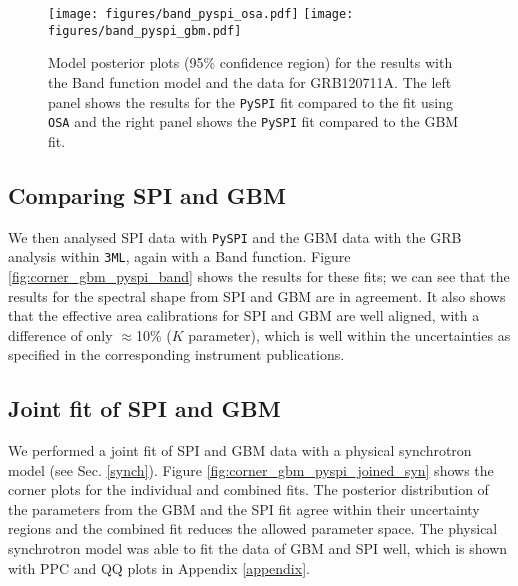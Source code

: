 \documentclass{aa}
\begin{document}
\begin{figure*}
  \begin{centering}
    \texttt{[image: figures/band\_pyspi\_osa.pdf]}
    \texttt{[image: figures/band\_pyspi\_gbm.pdf]}
    \caption{Model posterior plots (95\% confidence region) for the results with the Band function model and the data for GRB120711A. The left panel shows the results for the {\tt PySPI} fit compared to the fit using {\tt OSA} and the right panel shows the {\tt PySPI} fit compared to the GBM fit.}
    \label{fig:model_plot_band}
  \end{centering}
\end{figure*}

\subsection{Comparing SPI and GBM}
\label{pyspi_gbm}
We then analysed SPI data with {\tt PySPI} and the GBM data with the GRB analysis within {\tt 3ML}, again with a Band function. Figure \ref{fig:corner_gbm_pyspi_band} shows the results for these fits; we can see that the results for the spectral shape from SPI and GBM are in agreement. It also shows that the effective area calibrations for SPI and GBM are well aligned, with a difference of  only $\approx$10\%
 ($K$ parameter), which is well within the
uncertainties as specified in the corresponding instrument publications.

\subsection{Joint fit of SPI and GBM}
\label{pyspi_gbm_joined}
We performed a joint fit of SPI and GBM data with a physical synchrotron model (see Sec. \ref{synch}). Figure \ref{fig:corner_gbm_pyspi_joined_syn} shows the corner plots for the individual and combined fits. The posterior distribution of the parameters from the GBM and the SPI fit agree within their uncertainty regions and the combined fit reduces the allowed parameter space. The physical synchrotron model was able to fit the data of GBM and SPI well, which is shown with PPC and QQ plots in Appendix \ref{appendix}.
\end{document}
